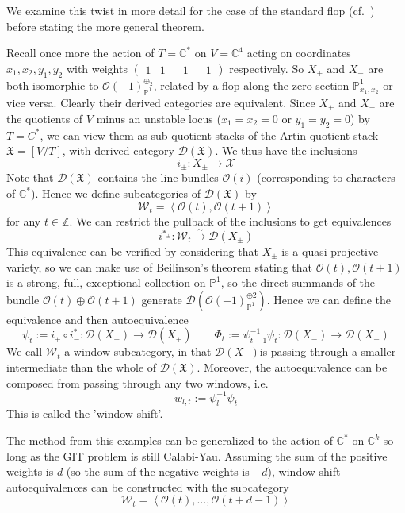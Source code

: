 We examine this twist in more detail for the case of the standard flop (cf.~\cite*{donovan_window_2014}) before stating the more general theorem. 

Recall once more the action of $T = \mathbb{C}^*$ on $V = \mathbb{C}^4$  acting on coordinates $x_{1}, x_{2}, y_{1},y_{2}$ with weights $\begin{pmatrix}1&1&-1&-1\end{pmatrix}$ respectively. So $X_+$ and $X_-$ are both isomorphic to $\mathcal{O}(-1)_{\mathbb{P}^1}^{\oplus_{2}}$, related by a flop along the zero section $\mathbb{P}^1_{x_{1},x_{2}}$ or vice versa. Clearly their derived categories are equivalent. Since $X_+$ and $X_-$ are the quotients of $V$ minus an unstable locus ($x_{1}= x_{2}= 0$ or $y_{1}= y_{2}=0$)  by $T = C^{*}$, we can view them as sub-quotient stacks of the Artin quotient stack $\mathfrak{X}=[V/T]$, with derived category $\mathcal{D}(\mathfrak{X})$. We thus have the inclusions $$
i_{\pm}: X_{\pm}\to \mathcal{X}
$$
Note that $\mathcal{D}(\mathfrak{X})$ contains the line bundles $\mathcal{O}(i)$ (corresponding to characters of $\mathbb{C}^*$).  Hence we define subcategories of $\mathcal{D}(\mathfrak{X})$ by $$
 \mathcal{W}_{t}= \left< \mathcal{O}(t), \mathcal{O}(t+1) \right> 
$$ for any $t \in \mathbb{Z}$. We can restrict the pullback of the inclusions to get equivalences $$
i^{*_{\pm}}:\mathcal{W}_{t} \xrightarrow{\sim} \mathcal{D}(X_{\pm})
$$
This equivalence can be verified by considering that $X_\pm$ is a quasi-projective variety, so we can make use of Beilinson's theorem stating that $\mathcal{O}(t), \mathcal{O}(t+1)$ is a strong, full, exceptional collection on $\mathbb{P}^1$, so the direct summands of the bundle $\mathcal{O}(t)\oplus \mathcal{O}(t+1)$ generate  $\mathcal{D}(\mathcal{O}(-1)_{\mathbb{P}^{1}}^{\oplus {2}})$.  Hence we can define the equivalence and then autoequivalence $$
\psi_{t}:= i_{+}\circ i_{-}^{*}: \mathcal{D}(X_{-})\to \mathcal{D}(X_{+}) \qquad \Phi_{t}:= \psi_{t-1}^{-1}\psi_{t}: \mathcal{D}(X_{-})\to \mathcal{D}(X_{-})
$$
We call $\mathcal{W}_t$ a window subcategory, in that $\mathcal{D}(X_{-})$is passing through a smaller intermediate than the whole of $\mathcal{D}(\mathfrak{X})$. Moreover, the autoequivalence can be composed from passing through any two windows, i.e. $$
w_{l,t}:= \psi_{l}^{-1}\psi_t
$$
This is called the 'window shift'. 

\begin{remark}{}{}
	The method from this examples can be generalized to the action of $\mathbb{C}^*$ on $\mathbb{C}^k$ so long as the GIT problem is still Calabi-Yau. Assuming the sum of the positive weights is $d$ (so the sum of the negative weights is $-d$), window shift autoequivalences can be constructed with the subcategory $$\mathcal{W}_{t}= \left< \mathcal{O}(t),\dots, \mathcal{O}(t+d-1) \right> $$
\end{remark}



